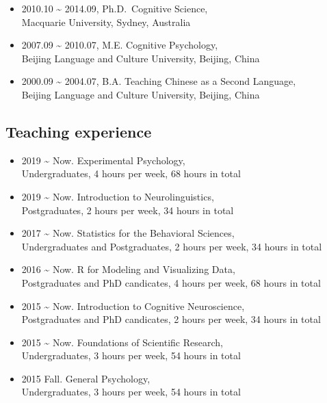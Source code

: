 \documentclass[12pt,]{article}
\begin{document}
\begin{itemize}
\item
  2010.10 \textasciitilde{} 2014.09, Ph.D.~Cognitive Science, \\
  Macquarie University, Sydney, Australia
\item
  2007.09 \textasciitilde{} 2010.07, M.E. Cognitive Psychology, \\
  Beijing Language and Culture University, Beijing, China
\item
  2000.09 \textasciitilde{} 2004.07, B.A. Teaching Chinese as a Second
  Language, \\
  Beijing Language and Culture University, Beijing, China
\end{itemize}

\hypertarget{teaching-experience}{%
\subsection{Teaching experience}\label{teaching-experience}}

\begin{itemize}
\item
  2019 \textasciitilde{} Now. Experimental Psychology, \\
  Undergraduates, 4 hours per week, 68 hours in total
\item
  2019 \textasciitilde{} Now. Introduction to Neurolinguistics, \\
  Postgraduates, 2 hours per week, 34 hours in total
\item
  2017 \textasciitilde{} Now. Statistics for the Behavioral Sciences, \\
  Undergraduates and Postgraduates, 2 hours per week, 34 hours in total
\item
  2016 \textasciitilde{} Now. R for Modeling and Visualizing Data, \\
  Postgraduates and PhD candicates, 4 hours per week, 68 hours in total
\item
  2015 \textasciitilde{} Now. Introduction to Cognitive Neuroscience, \\
  Postgraduates and PhD candicates, 2 hours per week, 34 hours in total
\item
  2015 \textasciitilde{} Now. Foundations of Scientific Research, \\
  Undergraduates, 3 hours per week, 54 hours in total
\item
  2015 Fall. General Psychology, \\
  Undergraduates, 3 hours per week, 54 hours in total
\end{itemize}
\end{document}
